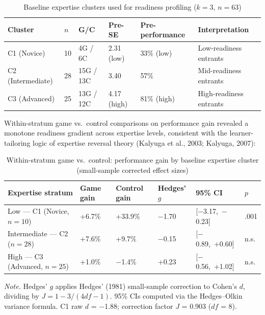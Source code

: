 \documentclass[12pt]{report}
\begin{document}
\begin{table}[htbp]
\centering
\caption{Baseline expertise clusters used for readiness profiling ($k = 3$, $n = 63$)}
\begin{tabularx}{\textwidth}{L{2.6cm}C{0.9cm}C{1.6cm}L{2.2cm}L{2.2cm}Y}
\toprule
\textbf{Cluster} & \textbf{$n$} & \textbf{G/C} & \textbf{Pre-SE} & \textbf{Pre-performance} & \textbf{Interpretation} \\
\midrule
C1 (Novice) & 10 & 4G / 6C & 2.31 (low) & 33\% (low) & Low-readiness entrants \\
C2 (Intermediate) & 28 & 15G / 13C & 3.40 & 57\% & Mid-readiness entrants \\
C3 (Advanced) & 25 & 13G / 12C & 4.17 (high) & 81\% (high) & High-readiness entrants \\
\bottomrule
\end{tabularx}
\end{table}

Within-stratum game vs.\ control comparisons on performance gain revealed a monotone readiness gradient across expertise levels, consistent with the learner-tailoring logic of expertise reversal theory (Kalyuga et al., 2003; Kalyuga, 2007):

\begin{table}[htbp]
\centering
\caption{Within-stratum game vs.\ control: performance gain by baseline expertise cluster (small-sample corrected effect sizes)}
\label{tab:stratum-effects}
\small
\setlength{\tabcolsep}{4pt}
\begin{tabular}{L{3.8cm}C{1.6cm}C{1.6cm}C{1.4cm}C{2.8cm}C{1.1cm}}
\toprule
\textbf{Expertise stratum} & \textbf{Game gain} & \textbf{Control gain} & \textbf{Hedges' $g$} & \textbf{95\% CI} & \textbf{$p$} \\
\midrule
Low --- C1 (Novice, $n=10$) & +6.7\% & +33.9\% & $-$1.70 & [$-$3.17,\ $-$0.23] & .001 \\
Intermediate --- C2 ($n=28$) & +7.6\% & +9.7\% & $-$0.15 & [$-$0.89,\ +0.60] & n.s. \\
High --- C3 (Advanced, $n=25$) & +1.0\% & $-$1.4\% & +0.23 & [$-$0.56,\ +1.02] & n.s. \\
\bottomrule
\end{tabular}
\normalsize
\setlength{\tabcolsep}{6pt}
\end{table}

\noindent\textit{Note.} Hedges' $g$ applies Hedges' (1981) small-sample correction to Cohen's $d$, dividing by $J = 1 - 3/(4df-1)$. 95\% CIs computed via the Hedges--Olkin variance formula. C1 raw $d$ = $-$1.88; correction factor $J$ = 0.903 ($df$ = 8).
\end{document}
